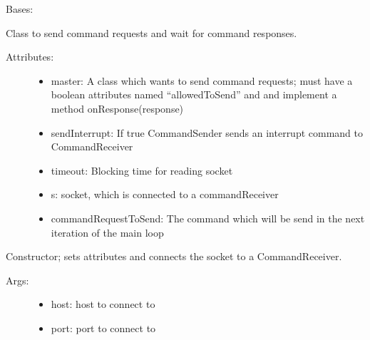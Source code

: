 \documentclass[letterpaper,10pt,english]{sphinxmanual}
\begin{document}

\begin{fulllineitems}
\label{communicationUtilities:communicationUtilities.CommandSender}
Bases: 

Class to send command requests and wait for command responses.
\begin{description}
\item[{Attributes:}] \leavevmode\begin{itemize}
\item {} 
master: A class which wants to send command requests; must have a boolean attributes named ``allowedToSend'' and and implement a method onResponse(response)

\item {} 
sendInterrupt: If true CommandSender sends an interrupt command to CommandReceiver

\item {} 
timeout: Blocking time for reading socket

\item {} 
s: socket, which is connected to a commandReceiver

\item {} 
commandRequestToSend: The command which will be send in the next iteration of the main loop

\end{itemize}

\end{description}

\begin{fulllineitems}
\label{communicationUtilities:communicationUtilities.CommandSender.__init__}
Constructor; sets attributes and connects the socket to a CommandReceiver.
\begin{description}
\item[{Args:}] \leavevmode\begin{itemize}
\item {} 
host: host to connect to

\item {} 
port: port to connect to


\end{itemize}
\end{description}
\end{fulllineitems}
\end{fulllineitems}
\end{document}
